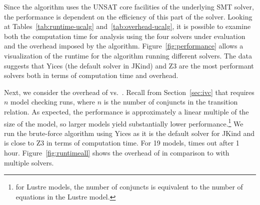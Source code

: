 Since the \ucalg algorithm uses the UNSAT core facilities of the
underlying SMT solver, the performance is dependent on the efficiency
of this part of the solver. Looking at Tables~\ref{tab:runtime-ucalg}
and~\ref{tab:overhead-ucalg}, it is possible to examine both the
computation time for analysis using the four solvers under evaluation
and the overhead imposed by the \ucalg algorithm.
Figure~\ref{fig:performance} allows a visualization of the runtime for
the \ucalg algorithm running different solvers. The data suggests that
Yices (the default solver in JKind) and Z3 are the most performant
solvers both in terms of computation time and overhead.






Next, we consider the overhead of \ucalg vs.\ \bfalg.  Recall from Section~\ref{sec:ivc} that \bfalg requires $n$ model checking runs, where $n$ is the number of conjuncts in the transition relation. As expected, the performance is approximately a linear multiple of the size of the model, so larger models yield substantially lower performance.\footnote{for Lustre models, the number of conjuncts is equivalent to the number of equations in the Lustre model.}  We run the brute-force algorithm using Yices as it is the default solver for JKind and is close to Z3 in terms of computation time.  For 19 models, \bfalg times out after 1 hour.   Figure~\ref{fig:runtimeall} shows the overhead of \bfalg in comparison to \ucalg with multiple solvers.


